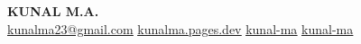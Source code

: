 \begin{center}
    \textbf{\Huge \scshape KUNAL M.A.} \\ \vspace{10pt}
    \small
    \href{mailto:kunalma23@gmail.com}{ \underline{kunalma23@gmail.com}} \quad
    \href{https://kunalma.pages.dev}{ \underline{kunalma.pages.dev}} \quad
    \href{https://www.linkedin.com/in/kunal-ma}{ \underline{kunal-ma}} \quad
    \href{https://github.com/kunal-ma}{ \underline{kunal-ma}} \\ \vspace{3pt}
\end{center}